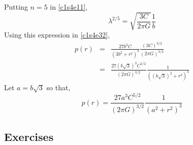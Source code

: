 \begin{itemize}
\begin{equation}
\end{equation}
Putting $n = 5$ in \eqref{c1s4e11},
\[
\lambda^{2/5} = \sqrt{\frac{3C}{2\pi G}}\frac{1}{b}
\]
Using this expression in \eqref{c1s4e32},
\begin{eqnarray*}
p(r) &=& \frac{27b^3C}{(3b^2 + r^2)^3} \frac{(3C)^{3/2}}{(2\pi G)^{3/2}} \\
 &=& \frac{27(b\sqrt{3})^3 C^{5/2}}{(2\pi G)^{3/2}} \frac{1}{((b\sqrt{3})^2 + r^2)^3}
\end{eqnarray*}
Let $a = b\sqrt{3}$ so that,
\begin{equation}\label{c1s4e33}
p(r) = \frac{27a^3 C^{5/2}}{(2\pi G)^{3/2}} \frac{1}{(a^2 + r^2)^3}
\end{equation}
\end{itemize}

\subsection{Exercises}
